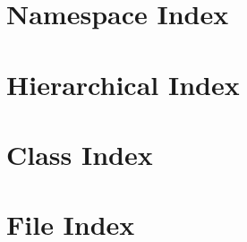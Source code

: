 \documentclass[twoside]{book}
\newcommand{\+}{\discretionary{\mbox{\scriptsize$\hookleftarrow$}}{}{}}
\begin{document}









\chapter{Namespace Index}

\chapter{Hierarchical Index}

\chapter{Class Index}

\chapter{File Index}

\end{document}
